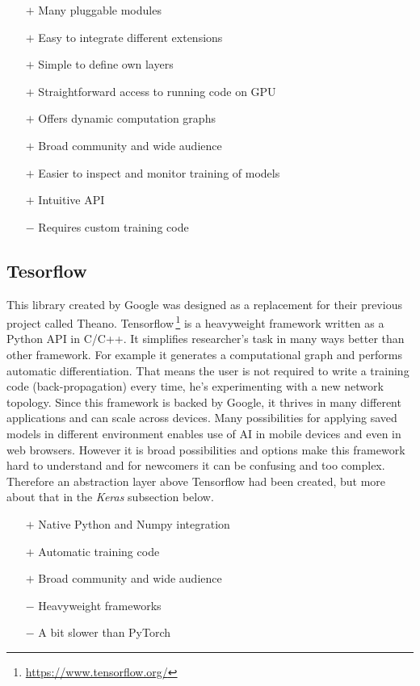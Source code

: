 \begin{itemize}
    \item[$\boldsymbol{+}$] Many pluggable modules
    \item[$\boldsymbol{+}$] Easy to integrate different extensions
    \item[$\boldsymbol{+}$] Simple to define own layers
    \item[$\boldsymbol{+}$] Straightforward access to running code on GPU
    \item[$\boldsymbol{+}$] Offers dynamic computation graphs
    \item[$\boldsymbol{+}$] Broad community and wide audience
    \item[$\boldsymbol{+}$] Easier to inspect and monitor training of models
    \item[$\boldsymbol{+}$] Intuitive API
    \item[$\boldsymbol{-}$] Requires custom training code
\end{itemize}

\subsection{Tesorflow}

This library created by Google was designed as a replacement for their previous project called Theano. Tensorflow\,\footnote{\url{https://www.tensorflow.org/}} is a heavyweight framework written as a Python API in C/C++. It simplifies researcher's task in many ways better than other framework. For example it generates a computational graph and performs automatic differentiation. That means the user is not required to write a training code (back-propagation) every time, he's experimenting with a new network topology. Since this framework is backed by Google, it thrives in many different applications and can scale across devices. Many possibilities for applying saved models in different environment enables use of AI in mobile devices and even in web browsers. However it is broad possibilities and options make this framework hard to understand and for newcomers it can be confusing and too complex. Therefore an abstraction layer above Tensorflow had been created, but more about that in the \textit{Keras} subsection below.

\begin{itemize}
    \item[$\boldsymbol{+}$] Native Python and Numpy integration
    \item[$\boldsymbol{+}$] Automatic training code
    \item[$\boldsymbol{+}$] Broad community and wide audience
    \item[$\boldsymbol{-}$] Heavyweight frameworks
    \item[$\boldsymbol{-}$] A bit slower than PyTorch
\end{itemize}

